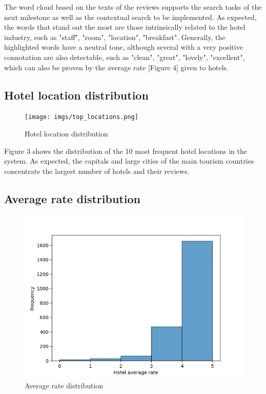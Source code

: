 \documentclass[sigconf]{acmart}
\begin{document}
The word cloud based on the texts of the reviews supports the search tasks of the next milestone as well as the contextual search to be implemented. As expected, the words that stand out the most are those intrinsically related to the hotel industry, such as "staff", "room", "location", "breakfast". Generally, the highlighted words have a neutral tone, although several with a very positive connotation are also detectable, such as "clean", "great", "lovely", "excellent", which can also be proven by the average rate [Figure 4] given to hotels.

\subsection{Hotel location distribution}

\begin{figure}[h]
  \centering
  \texttt{[image: imgs/top\_locations.png]}
  \caption{Hotel location distribution}
\end{figure}

Figure 3 shows the distribution of the 10 most frequent hotel locations in the system. As expected, the capitals and large cities of the main tourism countries concentrate the largest number of hotels and their reviews.

\subsection{Average rate distribution}

\begin{figure}[h]
  \centering
  \includegraphics[width=\linewidth]{imgs/rating_distributions.png}
  \caption{Average rate distribution}
\end{figure}
\end{document}
